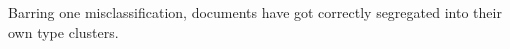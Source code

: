 \documentclass[9pt,academicons]{article}
\begin{document}
Barring one misclassification, documents have got correctly segregated into their own type
clusters.








\end{document}
